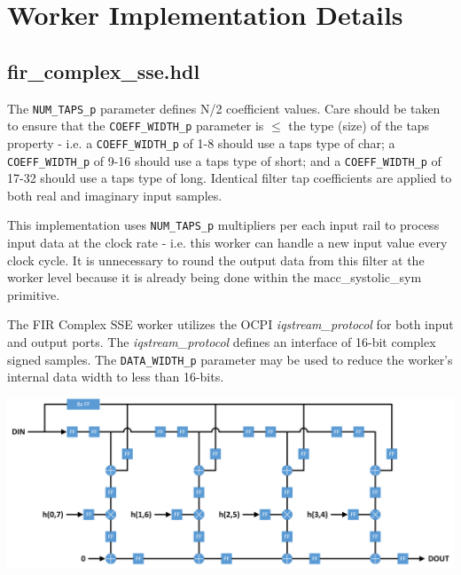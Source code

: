 \documentclass{article}
\def\comp{fir\_complex\_sse}
\begin{document}
\section*{Worker Implementation Details}
\subsection*{\comp.hdl}
\begin{flushleft}
	The \verb+NUM_TAPS_p+ parameter defines N/2 coefficient values. Care should be taken to ensure that the \verb+COEFF_WIDTH_p+ parameter is $\le$ the type (size) of the taps property - i.e. a \verb+COEFF_WIDTH_p+ of 1-8 should use a taps type of char; a \verb+COEFF_WIDTH_p+ of 9-16 should use a taps type of short; and a \verb+COEFF_WIDTH_p+ of 17-32 should use a taps type of long. Identical filter tap coefficients are applied to both real and imaginary input samples.\medskip

	This implementation uses \verb+NUM_TAPS_p+ multipliers per each input rail to process input data at the clock rate - i.e. this worker can handle a new input value every clock cycle. It is unnecessary to round the output data from this filter at the worker level because it is already being done within the macc\_systolic\_sym primitive.\medskip

	The FIR Complex SSE worker utilizes the OCPI \textit{iqstream\_protocol} for both input and output ports. The \textit{iqstream\_protocol} defines an interface of 16-bit complex signed samples. The \verb+DATA_WIDTH_p+ parameter may be used to reduce the worker's internal data width to less than 16-bits.
\end{flushleft}
{\centering\captionsetup{type=figure}\includegraphics[scale=0.65]{fir_systolic_sym_even}\par{}\label{fig:circuit}}
\end{document}
